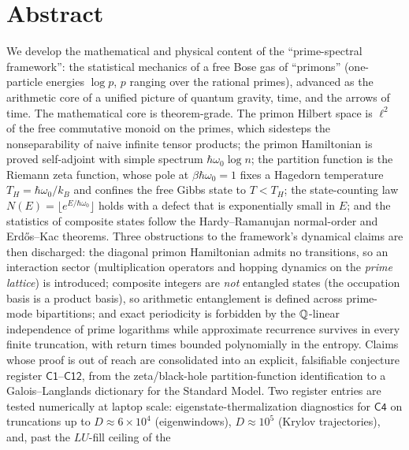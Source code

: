 
\section*{Abstract}
\noindent
We develop the mathematical and physical content of the ``prime-spectral framework'': the
statistical mechanics of a free Bose gas of ``primons'' (one-particle energies $\log p$, $p$
ranging over the rational primes), advanced as the arithmetic core of a unified picture of
quantum gravity, time, and the arrows of time. The mathematical core is theorem-grade. The
primon Hilbert space is $\ell^{2}$ of the free commutative monoid on the primes, which
sidesteps the nonseparability of naive infinite tensor products; the primon Hamiltonian is
proved self-adjoint with simple spectrum $\hbar\omega_{0}\log n$; the partition function is
the Riemann zeta function, whose pole at $\beta\hbar\omega_{0}=1$ fixes a Hagedorn temperature
$T_{H}=\hbar\omega_{0}/k_{B}$ and confines the free Gibbs state to $T<T_{H}$; the
state-counting law $N(E)=\lfloor e^{E/\hbar\omega_{0}}\rfloor$ holds with a defect that is
exponentially small in $E$; and the statistics of composite states follow the
Hardy--Ramanujan normal-order and Erd\H{o}s--Kac theorems. Three obstructions to the
framework's dynamical claims are then discharged: the diagonal primon Hamiltonian admits no
transitions, so an interaction sector (multiplication operators and hopping dynamics on the
\emph{prime lattice}) is introduced; composite integers are \emph{not} entangled states (the
occupation basis is a product basis), so arithmetic entanglement is defined across prime-mode
bipartitions; and exact periodicity is forbidden by the $\mathbb{Q}$-linear independence of prime
logarithms while approximate recurrence survives in every finite truncation, with return
times bounded polynomially in the entropy. Claims whose proof is out of reach are consolidated
into an explicit, falsifiable conjecture register $\mathsf{C1}$--$\mathsf{C12}$, from the
zeta/black-hole partition-function identification to a Galois--Langlands dictionary for the
Standard Model. Two register entries are tested numerically at laptop scale:
eigenstate-thermalization diagnostics for $\mathsf{C4}$ on truncations up to $D\approx6\times10^{4}$
(eigenwindows), $D\approx10^{5}$ (Krylov trajectories), and, past the $LU$-fill ceiling of the
